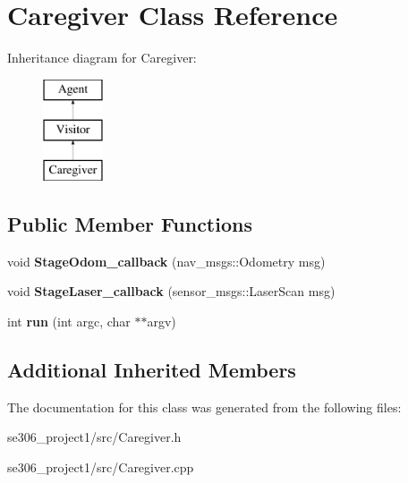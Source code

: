\hypertarget{classCaregiver}{\section{Caregiver Class Reference}
\label{classCaregiver}
}
Inheritance diagram for Caregiver\-:\begin{figure}[H]
\begin{center}
\leavevmode
\includegraphics[height=3.000000cm]{classCaregiver}
\end{center}
\end{figure}
\subsection*{Public Member Functions}
\begin{DoxyCompactItemize}
\item 
\hypertarget{classCaregiver_aa326466c62614b84d6a750dc0e59fa48}{void {\bfseries Stage\-Odom\-\_\-callback} (nav\-\_\-msgs\-::\-Odometry msg)}\label{classCaregiver_aa326466c62614b84d6a750dc0e59fa48}

\item 
\hypertarget{classCaregiver_a3dc0edd8065745e6f355f80f2b293ba1}{void {\bfseries Stage\-Laser\-\_\-callback} (sensor\-\_\-msgs\-::\-Laser\-Scan msg)}\label{classCaregiver_a3dc0edd8065745e6f355f80f2b293ba1}

\item 
\hypertarget{classCaregiver_a940203c96d2be4d4de57baee6bbf1a62}{int {\bfseries run} (int argc, char $\ast$$\ast$argv)}\label{classCaregiver_a940203c96d2be4d4de57baee6bbf1a62}

\end{DoxyCompactItemize}
\subsection*{Additional Inherited Members}


The documentation for this class was generated from the following files\-:\begin{DoxyCompactItemize}
\item 
se306\-\_\-project1/src/Caregiver.\-h\item 
se306\-\_\-project1/src/Caregiver.\-cpp\end{DoxyCompactItemize}
